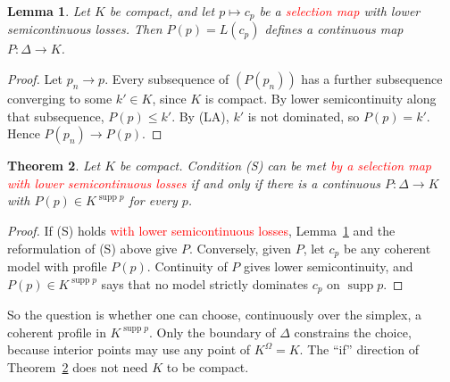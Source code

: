 \documentclass[11pt]{article}
\newtheorem{theorem}{Theorem}[section]
\newtheorem{lemma}[theorem]{Lemma}
\theoremstyle{definition}
\theoremstyle{remark}
\newcommand{\supp}{\operatorname{supp}}
\begin{document}
\begin{lemma}\label{lem:profcont}
Let $K$ be compact, and let $p\mapsto c_p$ be a \textcolor{red}{selection map} with lower semicontinuous losses. Then $P(p)=L(c_p)$ defines a continuous map $P:\Delta\to K$.
\end{lemma}
\begin{proof}
Let $p_n\to p$. Every subsequence of $(P(p_n))$ has a further subsequence converging to some $k'\in K$, since $K$ is compact. By lower semicontinuity along that subsequence, $P(p)\le k'$. By (LA), $k'$ is not dominated, so $P(p)=k'$. Hence $P(p_n)\to P(p)$.
\end{proof}

\begin{theorem}\label{thm:selection}
Let $K$ be compact. Condition (S) can be met \textcolor{red}{by a selection map with lower semicontinuous losses} if and only if there is a continuous $P:\Delta\to K$ with $P(p)\in K^{\supp p}$ for every $p$.
\end{theorem}
\begin{proof}
If (S) holds \textcolor{red}{with lower semicontinuous losses}, Lemma~\ref{lem:profcont} and the reformulation of (S) above give $P$. Conversely, given $P$, let $c_p$ be any coherent model with profile $P(p)$. Continuity of $P$ gives lower semicontinuity, and $P(p)\in K^{\supp p}$ says that no model strictly dominates $c_p$ on $\supp p$.
\end{proof}
So the question is whether one can choose, continuously over the simplex, a coherent profile in $K^{\supp p}$. Only the boundary of $\Delta$ constrains the choice, because interior points may use any point of $K^\Omega=K$. The ``if'' direction of Theorem~\ref{thm:selection} does not need $K$ to be compact.
\end{document}
